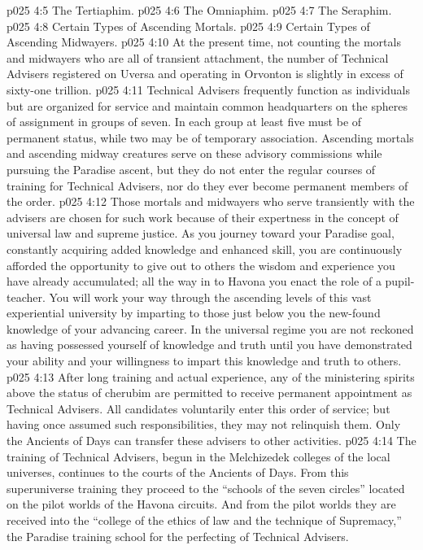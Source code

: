 \vs p025 4:5 \bibnobreakspace The Tertiaphim.
\vs p025 4:6 \bibnobreakspace The Omniaphim.
\vs p025 4:7 \bibnobreakspace The Seraphim.
\vs p025 4:8 \bibnobreakspace Certain Types of Ascending Mortals.
\vs p025 4:9 \bibnobreakspace Certain Types of Ascending Midwayers.
\pc \vs p025 4:10 At the present time, not counting the mortals and midwayers who are all of transient attachment, the number of Technical Advisers registered on Uversa and operating in Orvonton is slightly in excess of sixty\hyp{}one trillion.
\vs p025 4:11 Technical Advisers frequently function as individuals but are organized for service and maintain common headquarters on the spheres of assignment in groups of seven. In each group at least five must be of permanent status, while two may be of temporary association. Ascending mortals and ascending midway creatures serve on these advisory commissions while pursuing the Paradise ascent, but they do not enter the regular courses of training for Technical Advisers, nor do they ever become permanent members of the order.
\vs p025 4:12 Those mortals and midwayers who serve transiently with the advisers are chosen for such work because of their expertness in the concept of universal law and supreme justice. As you journey toward your Paradise goal, constantly acquiring added knowledge and enhanced skill, you are continuously afforded the opportunity to give out to others the wisdom and experience you have already accumulated; all the way in to Havona you enact the role of a pupil\hyp{}teacher. You will work your way through the ascending levels of this vast experiential university by imparting to those just below you the new\hyp{}found knowledge of your advancing career. In the universal regime you are not reckoned as having possessed yourself of knowledge and truth until you have demonstrated your ability and your willingness to impart this knowledge and truth to others.
\vs p025 4:13 After long training and actual experience, any of the ministering spirits above the status of cherubim are permitted to receive permanent appointment as Technical Advisers. All candidates voluntarily enter this order of service; but having once assumed such responsibilities, they may not relinquish them. Only the Ancients of Days can transfer these advisers to other activities.
\pc \vs p025 4:14 The training of Technical Advisers, begun in the Melchizedek colleges of the local universes, continues to the courts of the Ancients of Days. From this superuniverse training they proceed to the “schools of the seven circles” located on the pilot worlds of the Havona circuits. And from the pilot worlds they are received into the “college of the ethics of law and the technique of Supremacy,” the Paradise training school for the perfecting of Technical Advisers.
